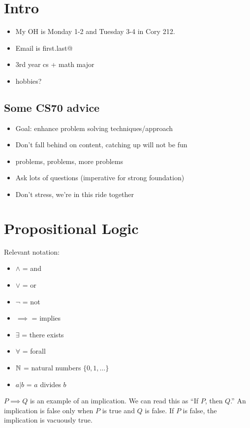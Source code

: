 \section{Intro}
\begin{itemize}
    \item My OH is Monday 1-2 and Tuesday 3-4 in Cory 212. 
    \item Email is first.last@
    \item 3rd year cs + math major 
    \item hobbies?
\end{itemize}

\subsection{Some CS70 advice}
\begin{itemize}
    \item Goal: enhance problem solving techniques/approach
    \item Don't fall behind on content, catching up will not be fun
    \item problems, problems, more problems
    \item Ask lots of questions (imperative for strong foundation)
    \item Don't stress, we're in this ride together
\end{itemize}

\section{Propositional Logic}
Relevant notation: \begin{itemize}
    \item $\land$ = and 
    \item $\lor$ = or 
    \item $\neg$ = not 
    \item $\implies$ = implies
    \item $\exists$ = there exists
    \item $\forall$ = forall
    \item $\operatorname{\mathbb{N}}$ = natural numbers $\{0, 1, \ldots \}$ 
    \item $a|b$ = $a$ divides $b$
\end{itemize}

$P \implies Q$ is an example of an implication. We can read this as ``If $P$, then $Q$.'' An implication is false only when $P$ is true and $Q$ is false. If $P$ is false, the implication is vacuously true. 

